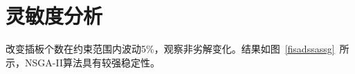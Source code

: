 \documentclass{whutmod}
\begin{document}
\section{灵敏度分析}
改变插板个数在约束范围内波动5\%，观察非劣解变化。结果如图~\ref{fisadssassg}~所示，NSGA-II算法具有较强稳定性。
\begin{figure}[H]
\centering
{}
\end{figure}	
\end{document}
